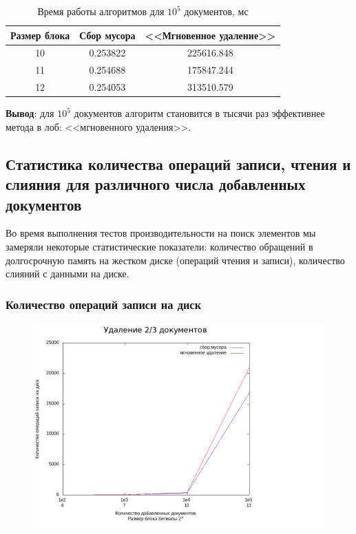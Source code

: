 \begin{table}[H]
      \caption{Время работы алгоритмов для $10^5$ документов, мс}
      \centering
      \small
      \singlespacing
      \begin{tabular}{|c|c|c|}
            \hline
            Размер блока & Сбор мусора                & <<Мгновенное удаление>> \\ \hline \hline
            10           & 0.253822                   & 225616.848              \\ \hline
            11           & 0.254688                   & 175847.244              \\ \hline
            12           & 0.254053                   & 313510.579              \\ \hline
\end{tabular}
\end{table}

\textbf{Вывод}: для $10^5$ документов алгоритм становится в тысячи раз
эффективнее метода в лоб: <<мгновенного удаления>>.

\newpage
\subsection{Статистика количества операций записи, чтения и слияния для различного числа добавленных документов}

Во время выполнения тестов производительности на поиск элементов мы замеряли
некоторые статистические показатели: количество обращений в долгосрочную память
на жестком диске (операций чтения и записи), количество слияний с данными на
диске.
\subsubsection{Количество операций записи на диск}

\begin{figure}[H]
\includegraphics[width=\linewidth]{fig/writecalls.png}
\end{figure}

